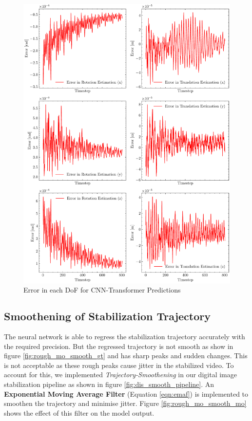 \begin{figure}[H]
    \centering
    \includegraphics[scale=0.55]{images/fig_chapter4/nn_related/error_in_predicted_vs_ground_truth_transformer.pdf}
    \caption{Error in each DoF for CNN-Transformer Predictions}
    \label{fig:cnn_trans_error}
\end{figure}

\subsection{Smoothening of Stabilization Trajectory}
The neural network is able to regress the stabilization trajectory accurately with the required precision. But the regressed trajectory is not smooth as show in figure \ref{fig:rough_mo_smooth_gt} and has sharp peaks and sudden changes. This is not acceptable as these rough peaks cause jitter in the stabilized video. To account for this, we implemented \textit{Trajectory-Smoothening} in our digital image stabilization pipeline as shown in figure \ref{fig:dis_smooth_pipeline}. An \textbf{Exponential Moving Average Filter} (Equation \ref{eqn:emaf}) is implemented to smoothen the trajectory and minimise jitter. Figure \ref{fig:rough_mo_smooth_mo} shows the effect of this filter on the model output.

